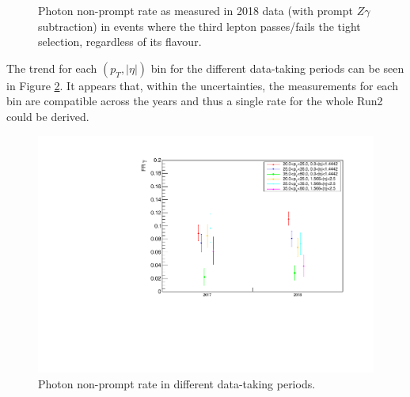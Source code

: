 \begin{figure}
\caption{Photon non-prompt rate as measured in 2018 data (with prompt $Z\gamma$ subtraction) in events where the third lepton passes/fails the tight selection, regardless of its flavour.}
\label{fig:phFR_PF}
\end{figure}

The trend for each $(p_{T}, |\eta|)$ bin for the different data-taking periods can be seen in Figure \ref{fig:phFR_time}.
It appears that, within the uncertainties, the measurements for each bin are compatible across the years and thus a single rate for the whole Run2 could be derived.

\begin{figure}
\centering
\includegraphics[width=.5\textwidth]{Figures/FR_VLtoL_pt-aeta_data-ZGToLLG_time.pdf}
\caption{Photon non-prompt rate in different data-taking periods.}
\label{fig:phFR_time}
\end{figure}

